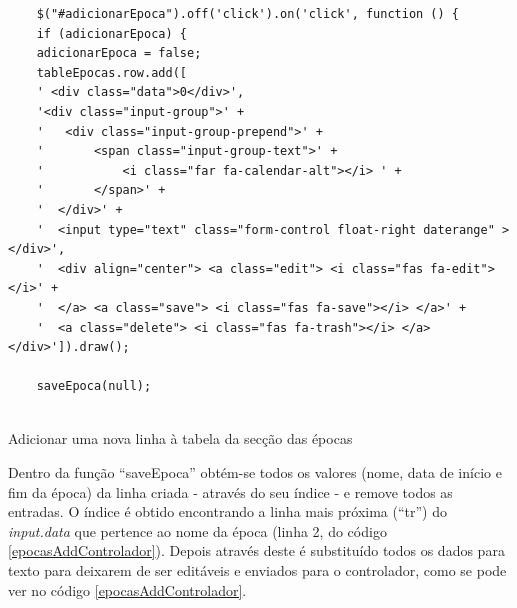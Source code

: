 \documentclass[12pt, twoside]{report}
\begin{document}
	\begin{listing}[H]
	\begin{verbatim}
	$("#adicionarEpoca").off('click').on('click', function () {
	if (adicionarEpoca) {
	adicionarEpoca = false;
	tableEpocas.row.add([
	' <div class="data">0</div>',
	'<div class="input-group">' +
	'   <div class="input-group-prepend">' +
	'       <span class="input-group-text">' +
	'           <i class="far fa-calendar-alt"></i> ' +
	'       </span>' +
	'  </div>' +
	'  <input type="text" class="form-control float-right daterange" > </div>',
	'  <div align="center"> <a class="edit"> <i class="fas fa-edit"> </i>' +
	'  </a> <a class="save"> <i class="fas fa-save"></i> </a>' +
	'  <a class="delete"> <i class="fas fa-trash"></i> </a></div>']).draw();
	
	saveEpoca(null);
					
	\end{verbatim}
	\caption{Adicionar uma nova linha à tabela da secção das épocas}
	\label{epocasAddDatable}
	\end{listing}
	
	Dentro da função ``saveEpoca'' obtém-se todos os valores (nome, data de início e fim da época) da linha criada - através do seu índice - e remove todos as entradas. O índice é obtido encontrando a linha mais próxima (``tr'') do \textit{input.data} que pertence ao nome da época (linha 2, do código \ref{epocasAddControlador}). Depois através deste é substituído todos os dados para texto para deixarem de ser editáveis e enviados para o controlador, como se pode ver no código \ref{epocasAddControlador}.
 	
\end{document}
